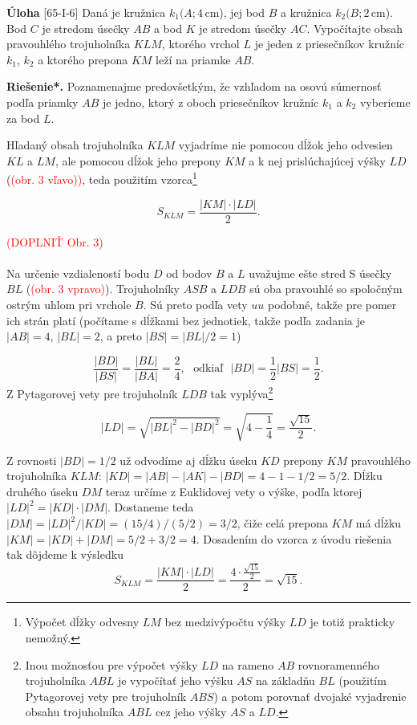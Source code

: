 \documentclass{article}
\newcommand{\rieh}{\textbf{Riešenie*.} }
\newcommand\todo[1]{\noindent\textcolor{red}{(#1)}}
\newcommand{\problem}[4]{
  \begin{tcolorbox}[breakable,notitle,boxrule=0pt,colback=light-gray,colframe=light-gray]
    \textbf{Úloha}
    [#1] #3
  \end{tcolorbox}
  \noindent#4
}
\begin{document}
\problem{65-I-6}{}{
Daná je kružnica $k_1 (A; 4$\,cm), jej bod $B$ a kružnica $k_2 (B; 2$\,cm). Bod $C$ je stredom úsečky $AB$ a bod $K$ je stredom úsečky $AC$. Vypočítajte obsah pravouhlého trojuholníka $KLM$, ktorého vrchol $L$ je jeden z priesečníkov kružníc $k_1$, $k_2$ a ktorého prepona $KM$ leží na priamke $AB$.
}{


\rieh Poznamenajme predovšetkým, že vzhľadom na osovú súmernosť podľa priamky $AB$ je jedno, ktorý z oboch priesečníkov kružníc $k_1$ a $k_2$ vyberieme za bod $L$.

Hľadaný obsah trojuholníka $KLM$ vyjadríme nie pomocou dĺžok jeho odvesien $KL$ a $LM$, ale pomocou dĺžok jeho prepony $KM$ a k nej prislúchajúcej výšky $LD$ (\todo{obr. 3 vľavo)}, teda použitím vzorca\footnote{Výpočet dĺžky odvesny $LM$ bez medzivýpočtu výšky $LD$ je totiž prakticky nemožný.}


$$S_{KLM} = \frac{|KM| \cdot |LD|}{2}.$$

\todo{DOPLNIŤ Obr. 3}\\
\\
Na určenie vzdialeností bodu $D$ od bodov $B$ a $L$ uvažujme ešte stred S úsečky $BL$ (\todo{obr. 3 vpravo}). Trojuholníky $ASB$ a $LDB$ sú oba pravouhlé so spoločným ostrým uhlom pri vrchole $B$. Sú preto podľa vety $uu$ podobné, takže pre pomer ich strán platí (počítame s dĺžkami bez jednotiek, takže podľa zadania je $|AB| = 4$, $|BL| = 2$, a preto $|BS| = |BL|/2 = 1$)

$$\frac{|BD|}{|BS|}=\frac{|BL|}{|BA|}=\frac{2}{4}, \ \ \ \text{odkiaľ} \ \ \ |BD| =\frac{1}{2}|BS| =\frac{1}{2}.$$
Z Pytagorovej vety pre trojuholník $LDB$ tak vyplýva\footnote{Inou možnosťou pre výpočet výšky $LD$ na rameno $AB$ rovnoramenného trojuholníka $ABL$ je vypočítať jeho výšku $AS$ na základňu $BL$ (použitím Pytagorovej vety pre trojuholník $ABS$) a potom porovnať dvojaké vyjadrenie obsahu trojuholníka $ABL$ cez jeho výšky $AS$ a $LD$.}

$$|LD| =\sqrt{|BL|^2-|BD|^2}=\sqrt{4-\frac{1}{4}}=\frac{\sqrt{15}}{2}.$$

Z rovnosti $|BD| = 1/2$ už odvodíme aj dĺžku úseku $KD$ prepony $KM$ pravouhlého trojuholníka $KLM$: $|KD| = |AB| - |AK| - |BD| = 4 - 1 - 1/2 = 5/2$. Dĺžku druhého úseku $DM$ teraz určíme z Euklidovej vety o výške, podľa ktorej $|LD|^2 = |KD| \cdot |DM|$. Dostaneme teda $|DM| = |LD|^2 /|KD| = (15/4)/(5/2) = 3/2$, čiže celá prepona $KM$ má dĺžku $|KM| = |KD| + |DM| = 5/2 + 3/2 = 4$. Dosadením do vzorca z úvodu riešenia tak dôjdeme k výsledku
$$S_{KLM} = \frac{|KM| \cdot |LD|}{2}=\frac{4 \cdot \frac{\sqrt{15}}{2}}{2}=\sqrt{15}.$$


}
\end{document}
